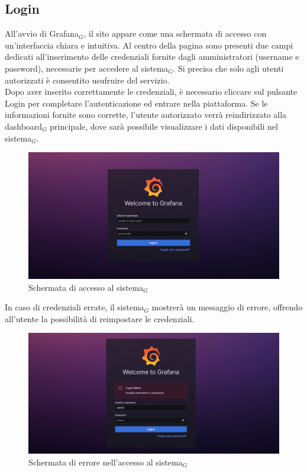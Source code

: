 \documentclass[10pt]{article}
\begin{document}
\begin{justify}
\subsection{Login}
All'avvio di Grafana$_G$, il sito appare come una schermata di accesso con un'interfaccia chiara e intuitiva. Al centro della pagina sono presenti due campi dedicati all'inserimento delle credenziali fornite dagli amministratori (username e password), necessarie per accedere al sistema$_G$. Si precisa che solo agli utenti autorizzati è consentito usufruire del servizio.\\
Dopo aver inserito correttamente le credenziali, è necessario cliccare sul pulsante Login per completare l'autenticazione ed entrare nella piattaforma. Se le informazioni fornite sono corrette, l'utente autorizzato verrà reindirizzato alla dashboard$_G$ principale, dove sarà possibile visualizzare i dati disponibili nel sistema$_G$.\\
\begin{figure}[H]
    \centering
    \includegraphics[width=0.7\linewidth]{login.png}
    \caption{Schermata di accesso al sistema$_G$}
\end{figure}
\noindent
In caso di credenziali errate, il sistema$_G$ mostrerà un messaggio di errore, offrendo all'utente la possibilità di reimpostare le credenziali.
\begin{figure}[H]
    \centering
    \includegraphics[width=0.7\linewidth]{error.png}
    \caption{Schermata di errore nell'accesso al sistema$_G$}
\end{figure}


\end{justify}
\end{document}

